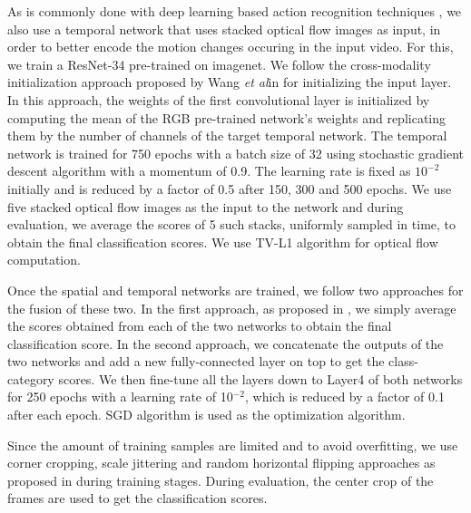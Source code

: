 \documentclass{bmvc2k}
\def\etal{\emph{et al}\bmvaOneDot}
\newcommand{\rev}[2]{#2}
\begin{document}
As is commonly done with deep learning based action recognition techniques \cite{simonyan2014two} \cite{TSN2016ECCV} \cite{ma2016deeper} \cite{singh2016first} \cite{tang2017action} \cite{carreira2017quo}, we also use a temporal network that uses stacked optical flow images as input, in order to better encode the motion changes occuring in the input video. For this, we train a ResNet-34 pre-trained on imagenet. We follow the cross-modality initialization approach proposed by Wang \etal in \cite{TSN2016ECCV} for initializing the input layer. In this approach, the weights of the first convolutional layer is initialized by computing the mean of the RGB pre-trained network's weights and replicating them by the number of channels of the target temporal network. The temporal network is trained for 750 epochs with a batch size of 32 using stochastic gradient descent algorithm with a momentum of 0.9. The learning rate is fixed as $10^{-2}$ initially and is reduced by a factor of 0.5 after 150, 300 and 500 epochs. We use five stacked optical flow images as the input to the network and during evaluation, we average the scores of 5 such stacks, uniformly sampled in time, to obtain the final classification scores. We use TV-L1 algorithm \cite{zach2007duality} for optical flow computation.

Once the spatial and temporal networks are trained, we follow two approaches for the fusion of these two. In the first approach, as proposed in \cite{simonyan2014two}, we simply average the scores obtained from each of the two networks to obtain the final classification score. In the second approach, we concatenate the outputs of the two networks and add a new fully-connected layer on top to get the class-category scores. \rev{We then train the newly added fully-connected layer along with the fully-connected layers of the individual networks for 50 epochs with a learning rate of $10^{-3}$ which is reduced by a factor of 0.5 after 5, 20 and 50 epochs}{We then fine-tune all the layers down to Layer4 of both networks for 250 epochs with a learning rate of 10$^{-2}$, which is reduced by a factor of 0.1 after each epoch}. \rev{ADAM}{SGD} algorithm is used as the optimization algorithm.

Since the amount of training samples are limited and to avoid overfitting, we use corner cropping, scale jittering and random horizontal flipping approaches as proposed in \cite{TSN2016ECCV} during training stages. During evaluation, the center crop of the frames are used to get the classification scores.
\end{document}
